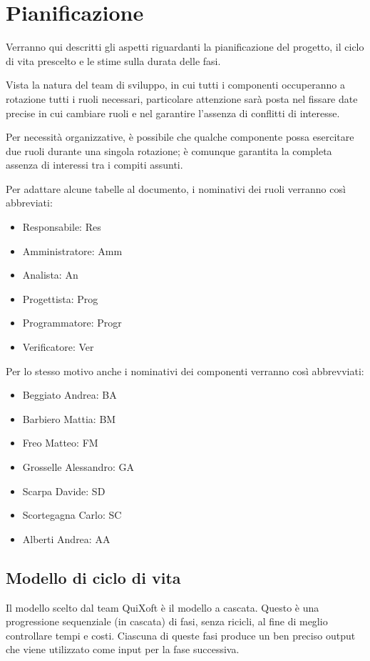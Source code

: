 \documentclass[11pt,a4paper]{article}
\begin{document}
\section{Pianificazione}
Verranno qui descritti gli aspetti riguardanti la pianificazione del progetto, il ciclo di vita prescelto e le stime sulla durata delle fasi.

Vista la natura del team di sviluppo, in cui tutti i componenti occuperanno a rotazione tutti i ruoli necessari, particolare attenzione sarà posta nel fissare date precise in cui cambiare ruoli e nel garantire l'assenza di conflitti di interesse.

Per necessità organizzative, è possibile che qualche componente possa esercitare due ruoli durante una singola rotazione; è comunque garantita la completa assenza di interessi tra i compiti assunti.
\bigskip

Per adattare alcune tabelle al documento, i nominativi dei ruoli verranno così abbreviati:
\begin{itemize}
\item Responsabile: Res
\item Amministratore: Amm
\item Analista: An
\item Progettista: Prog
\item Programmatore: Progr
\item Verificatore: Ver
\end{itemize}
\bigskip
Per lo stesso motivo anche i nominativi dei componenti verranno così abbrevviati:
\begin{itemize}
\item Beggiato Andrea: BA
\item Barbiero Mattia: BM
\item Freo Matteo: FM
\item Grosselle Alessandro: GA
\item Scarpa Davide: SD
\item Scortegagna Carlo: SC
\item Alberti Andrea: AA
\end{itemize}
\subsection{Modello di ciclo di vita}
Il modello scelto dal team QuiXoft è il modello a cascata.
Questo è una progressione sequenziale (in cascata) di fasi, senza ricicli, al fine di meglio controllare tempi e costi.
Ciascuna di queste fasi produce un ben preciso output che viene utilizzato come input per la fase successiva.
\end{document}
